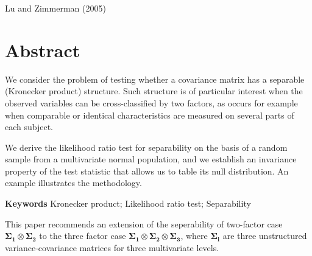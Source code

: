 Lu and Zimmerman (2005)
%


\section*{Abstract}
We consider the problem of testing whether a covariance matrix has a separable (Kronecker product) structure. 
Such structure is of particular interest when the observed variables can be cross-classified by two factors, 
as occurs for example when comparable or identical characteristics are measured on several parts of each subject. 

We derive the likelihood ratio test for separability on the basis of a random sample from a multivariate normal 
population, and we establish an invariance property of the test statistic that allows us to table its null distribution. 
An example illustrates the methodology.

\textbf{Keywords}
Kronecker product; Likelihood ratio test; Separability

This paper recommends an extension of the seperability of two-factor case $\boldsymbol{\Sigma_1}\otimes \boldsymbol{\Sigma_2}$ to the 
three factor case $\boldsymbol{\Sigma_1}\otimes \boldsymbol{\Sigma_2} \otimes \boldsymbol{\Sigma_3}$, where $ \boldsymbol{\Sigma_i}$ are three unstructured variance-covariance matrices for
three multivariate levels.
